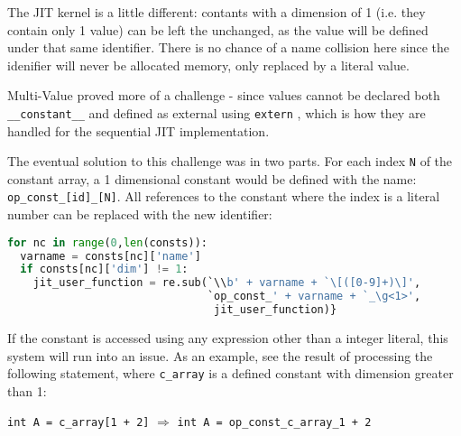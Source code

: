 The JIT kernel is a little different: contants with a dimension of 1 (i.e. they contain only 1 value) can be left the unchanged, as the value will be defined under that same identifier. There is no chance of a name collision here since the idenifier will never be allocated memory, only replaced by a literal value.
\par
Multi-Value proved more of a challenge - since values cannot be declared both \verb|__constant__| and defined as external using \verb|extern| \cite[p126]{guide}, which is how they are handled for the sequential JIT implementation.
\par
The eventual solution to this challenge was in two parts. For each index \verb|N| of the constant array, a 1 dimensional constant would be defined with the name: \verb|op_const_[id]_[N]|. All references to the constant where the index is a literal number can be replaced with the new identifier:
\begin{lstlisting}[backgroundcolor = \color{lightgray!20}, language=Python]
for nc in range(0,len(consts)):
  varname = consts[nc]['name']
  if consts[nc]['dim'] != 1:
    jit_user_function = re.sub(`\\b' + varname + `\[([0-9]+)\]',
                               `op_const_' + varname + `_\g<1>',
                                jit_user_function)}
\end{lstlisting}

If the constant is accessed using any expression other than a integer literal, this system will run into an issue. As an example, see the result of processing the following statement, where \verb|c_array| is a defined constant with dimension greater than 1:
\begin{center}
\lstinline|int A = c_array[1 + 2]| \space{1cm}$\Rightarrow$\space{1cm} \lstinline |int A = op_const_c_array_1 + 2|
\end{center}

